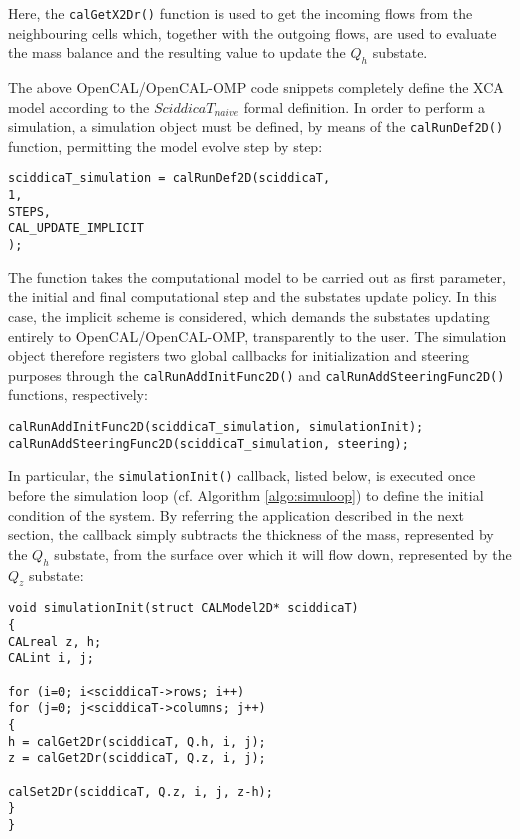 \noindent Here, the \verb'calGetX2Dr()' function is used to get the
incoming flows from the neighbouring cells which, together with the
outgoing flows, are used to evaluate the mass balance and the
resulting value to update the $Q_h$ substate.

The above OpenCAL/OpenCAL-OMP code snippets completely define the
XCA model according to the $SciddicaT_{naive}$ formal definition. In
order to perform a simulation, a simulation object must be defined,
by means of the \verb'calRunDef2D()' function, permitting the model
evolve step by step:

\begin{lstlisting}[basicstyle=\footnotesize, numbers=none]
sciddicaT_simulation = calRunDef2D(sciddicaT,
1,
STEPS,
CAL_UPDATE_IMPLICIT
);
\end{lstlisting}

\noindent The function takes the computational model to be carried out as
first parameter, the initial and final computational step and the
substates update policy. In this case, the implicit scheme is
considered, which demands the substates updating entirely to
OpenCAL/OpenCAL-OMP, transparently to the user. The simulation
object therefore registers two global callbacks for initialization
and steering purposes through the \verb'calRunAddInitFunc2D()' and
\verb'calRunAddSteeringFunc2D()' functions, respectively:

\begin{lstlisting}[basicstyle=\footnotesize, numbers=none]
calRunAddInitFunc2D(sciddicaT_simulation, simulationInit);
calRunAddSteeringFunc2D(sciddicaT_simulation, steering);
\end{lstlisting}

\noindent In particular, the \verb'simulationInit()' callback, listed below,
is executed once before the simulation loop (cf. Algorithm
\ref{algo:simuloop}) to define the initial condition of the
system. By referring the application described in the next section,
the callback simply subtracts the thickness of the mass, represented
by the $Q_h$ substate, from the surface over which it will
flow down, represented by the $Q_z$ substate:

\begin{lstlisting}[basicstyle=\footnotesize, numbers=none]
void simulationInit(struct CALModel2D* sciddicaT)
{
CALreal z, h;
CALint i, j;

for (i=0; i<sciddicaT->rows; i++)
for (j=0; j<sciddicaT->columns; j++)
{
h = calGet2Dr(sciddicaT, Q.h, i, j);
z = calGet2Dr(sciddicaT, Q.z, i, j);

calSet2Dr(sciddicaT, Q.z, i, j, z-h);
}
}
\end{lstlisting}

